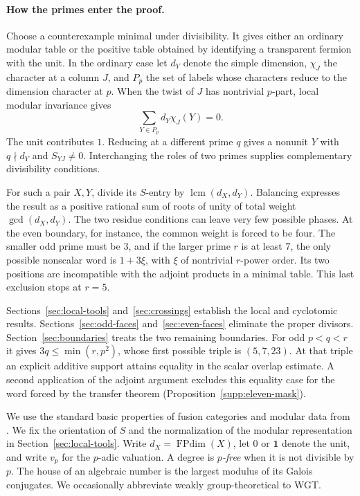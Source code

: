 \documentclass[11pt,a4paper]{article}
\numberwithin{equation}{section}
\newcommand{\one}{\mathbf1}
\newcommand{\lcm}{\operatorname{lcm}}
\begin{document}
\paragraph{How the primes enter the proof.}
Choose a counterexample minimal under divisibility. It gives either an
ordinary modular table or the positive table obtained by identifying
a transparent fermion with the unit. In the ordinary case let $d_Y$
denote the simple dimension, $\chi_J$ the character at a column $J$,
and $P_p$ the set of labels whose characters reduce to the dimension
character at $p$. When the twist of $J$ has nontrivial $p$-part,
local modular invariance gives
\[
               \sum_{Y\in P_p}d_Y\chi_J(Y)=0 .
\]
The unit contributes $1$. Reducing at a different prime $q$ gives a
nonunit $Y$ with $q\nmid d_Y$ and $S_{YJ}\ne0$. Interchanging the
roles of two primes supplies complementary divisibility conditions.

For such a pair $X,Y$, divide its $S$-entry by
$\lcm(d_X,d_Y)$. Balancing expresses the result as a positive rational
sum of roots of unity of total weight $\gcd(d_X,d_Y)$. The two residue
conditions can leave very few possible phases. At the even boundary,
for instance, the common weight is forced to be four. The smaller
odd prime must be $3$, and if the larger prime $r$ is at least $7$,
the only possible nonscalar word is $1+3\xi$, with $\xi$ of nontrivial
$r$-power order. Its two positions are incompatible with the adjoint
products in a minimal table. This last exclusion stops at $r=5$.

Sections~\ref{sec:local-tools} and~\ref{sec:crossings} establish the
local and cyclotomic results. Sections~\ref{sec:odd-faces}
and~\ref{sec:even-faces} eliminate the proper divisors.
Section~\ref{sec:boundaries} treats the two remaining boundaries.
For odd $p<q<r$ it gives $3q\le\min(r,p^2)$, whose first possible
triple is $(5,7,23)$. At that triple an explicit additive support
attains equality in the scalar overlap estimate. A second application
of the adjoint argument excludes this equality case for the word
forced by the transfer theorem (Proposition~\ref{supp:eleven-mask}).

We use the standard basic properties of fusion categories and modular
data from \cite{EGNO}. We fix the orientation of $S$ and the
normalization of the modular representation in
Section~\ref{sec:local-tools}.
Write $d_X=\operatorname{FPdim}(X)$, let $0$ or $\one$ denote the
unit, and write $v_p$ for the $p$-adic valuation. A degree is
\emph{$p$-free} when it is not divisible by $p$. The house of an
algebraic number is the largest modulus of its Galois conjugates.
We occasionally abbreviate weakly group-theoretical to WGT.
\end{document}
